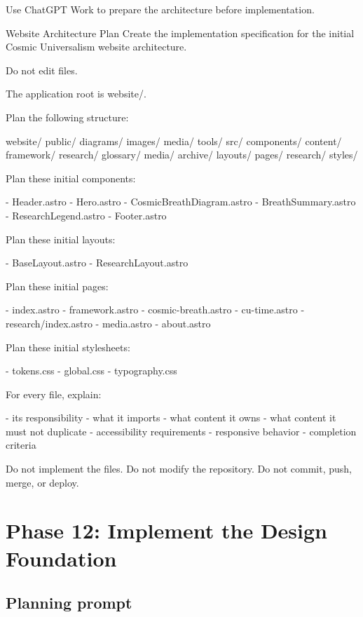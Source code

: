 \documentclass[11pt,letterpaper]{article}
\begin{document}
Use ChatGPT Work to prepare the architecture before implementation.

\begin{promptbox}{Website Architecture Plan}
Create the implementation specification for the initial Cosmic
Universalism website architecture.

Do not edit files.

The application root is website/.

Plan the following structure:

website/
  public/
    diagrams/
    images/
    media/
    tools/
  src/
    components/
    content/
      framework/
      research/
      glossary/
      media/
      archive/
    layouts/
    pages/
      research/
    styles/

Plan these initial components:

- Header.astro
- Hero.astro
- CosmicBreathDiagram.astro
- BreathSummary.astro
- ResearchLegend.astro
- Footer.astro

Plan these initial layouts:

- BaseLayout.astro
- ResearchLayout.astro

Plan these initial pages:

- index.astro
- framework.astro
- cosmic-breath.astro
- cu-time.astro
- research/index.astro
- media.astro
- about.astro

Plan these initial stylesheets:

- tokens.css
- global.css
- typography.css

For every file, explain:

- its responsibility
- what it imports
- what content it owns
- what content it must not duplicate
- accessibility requirements
- responsive behavior
- completion criteria

Do not implement the files.
Do not modify the repository.
Do not commit, push, merge, or deploy.
\end{promptbox}

\section{Phase 12: Implement the Design Foundation}

\subsection{Planning prompt}
\end{document}
